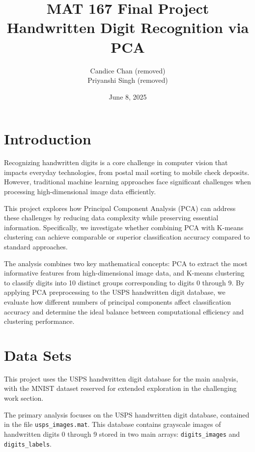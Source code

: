 \documentclass{article}
\title{MAT 167 Final Project \\ {\large Handwritten Digit Recognition via PCA}}
\author{Candice Chan (removed) \\
{\large Priyanshi Singh (removed)}}
\date{June 8, 2025}
\begin{document}
\maketitle


\section{Introduction}
Recognizing handwritten digits is a core challenge in computer vision that impacts everyday technologies, from postal mail sorting to mobile check deposits. However, traditional machine learning approaches face significant challenges when processing high-dimensional image data efficiently.

This project explores how Principal Component Analysis (PCA) can address these challenges by reducing data complexity while preserving essential information. Specifically, we investigate whether combining PCA with K-means clustering can achieve comparable or superior classification accuracy compared to standard approaches.

The analysis combines two key mathematical concepts: PCA to extract the most informative features from high-dimensional image data, and K-means clustering to classify digits into 10 distinct groups corresponding to digits 0 through 9. By applying PCA preprocessing to the USPS handwritten digit database, we evaluate how different numbers of principal components affect classification accuracy and determine the ideal balance between computational efficiency and clustering performance.


\section{Data Sets}
This project uses the USPS handwritten digit database for the main analysis, with the MNIST dataset reserved for extended exploration in the challenging work section.

The primary analysis focuses on the USPS handwritten digit database, contained in the file \texttt{usps\_images.mat}. This database contains grayscale images of handwritten digits 0 through 9 stored in two main arrays: \texttt{digits\_images} and \texttt{digits\_labels}.
\end{document}
